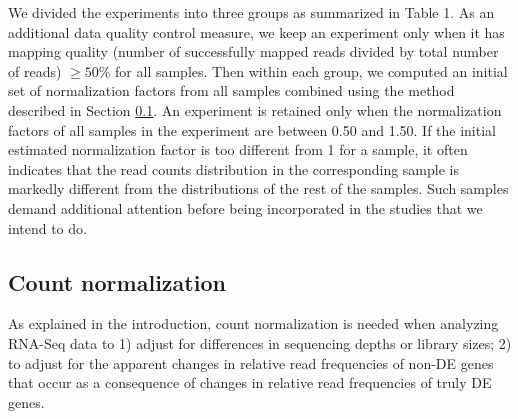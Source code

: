 \documentclass[fleqn,10pt,lineno]{wlpeerj} %
\begin{document}


We divided the experiments into three groups as summarized in Table 1.  As an
additional data quality control measure,  we keep an experiment only when it 
has mapping quality (number of successfully mapped reads divided by total number of reads) $\geq 
50\%$ for all samples.
Then within each group, we computed an
initial set of normalization factors from all samples combined using the method
described in Section \ref{section:countNormalization}.  An experiment is
retained only when the normalization factors of all samples in the experiment
are between 0.50 and 1.50.  If the initial estimated normalization factor is
too different from 1 for a sample, it often indicates that the read counts
distribution in the corresponding sample is markedly different from the
distributions of the rest of the samples. Such samples demand additional
attention before being incorporated in the studies that we intend to do.



\subsection{Count normalization}\label{section:countNormalization}
As explained in the introduction, count normalization is needed when analyzing RNA-Seq data to
1) adjust for differences in sequencing depths or
library sizes; 2) to adjust for the apparent changes in relative read
frequencies of non-DE genes that occur as a consequence of changes in relative read frequencies of 
truly DE genes. 
\end{document}
